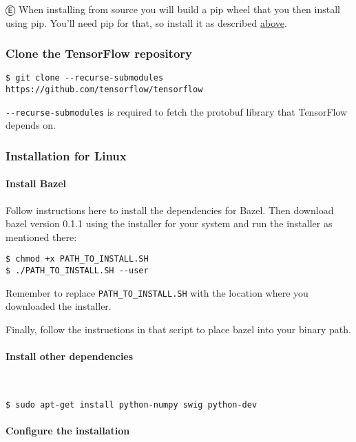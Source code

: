 Ⓔ \textcolor{etc}{When installing from source you will build a pip wheel that you then install using pip. You'll need pip for that, so install it as described \hyperref[pip_install]{above}.}

\subsubsection {Clone the TensorFlow repository}
\begin{lstlisting}
$ git clone --recurse-submodules https://github.com/tensorflow/tensorflow
\end{lstlisting}
\lstinline{--recurse-submodules} is required to fetch the protobuf library that TensorFlow depends on.


\subsubsection {Installation for Linux}

\paragraph{Install Bazel}

Follow instructions here to install the dependencies for Bazel. Then download bazel version 0.1.1 using the installer for your system and run the installer as mentioned there:

\begin{lstlisting}
$ chmod +x PATH_TO_INSTALL.SH
$ ./PATH_TO_INSTALL.SH --user
\end{lstlisting}

Remember to replace \lstinline{PATH_TO_INSTALL.SH} with the location where you downloaded the installer.

Finally, follow the instructions in that script to place bazel into your binary path.

\paragraph{Install other dependencies}\\

\begin{lstlisting}
$ sudo apt-get install python-numpy swig python-dev
\end{lstlisting}

\paragraph{Configure the installation}

